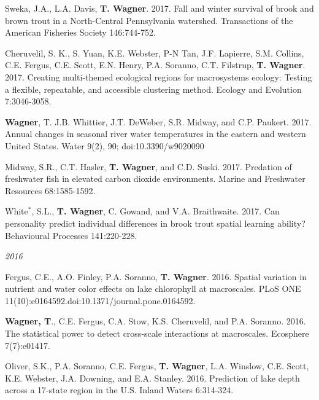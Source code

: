 \documentclass[10pt]{article}
\begin{document}
\begin{flushleft}
\begin{etaremune}[start=68]
\item Sweka, J.A., L.A. Davis, {\bf T. Wagner}. 2017. Fall and winter survival of brook and brown trout in a North-Central Pennsylvania watershed. Transactions of the American Fisheries Society 146:744-752.

\item Cheruvelil, S. K., S. Yuan, K.E. Webster, P-N Tan, J.F. Lapierre, S.M. Collins, C.E. Fergus, C.E. Scott, E.N. Henry, P.A. Soranno, C.T. Filstrup, {\bf T. Wagner}. 2017. Creating multi-themed ecological regions for macrosystems ecology: Testing a flexible, repeatable, and accessible clustering method. Ecology and Evolution 7:3046-3058.

\item {\bf Wagner}, T. J.B. Whittier, J.T. DeWeber, S.R. Midway, and C.P. Paukert. 2017. Annual changes in seasonal river water temperatures in the eastern and western United States. Water 9(2), 90; doi:10.3390/w9020090

\item Midway, S.R., C.T. Hasler, {\bf T. Wagner}, and C.D. Suski. 2017. Predation of freshwater fish in elevated carbon dioxide environments. Marine and Freshwater Resources 68:1585-1592.

\item White$^*$, S.L., {\bf T. Wagner}, C. Gowand, and V.A. Braithwaite. 2017. Can personality predict individual differences in brook trout spatial learning ability? Behavioural Processes 141:220-228. 

\end{etaremune}
\emph{2016}
\begin{etaremune}[start=55]

\item Fergus, C.E., A.O. Finley, P.A. Soranno, {\bf T. Wagner}. 2016. Spatial variation in nutrient and water color effects on lake chlorophyll at macroscales. PLoS ONE 11(10):e0164592.doi:10.1371/journal.pone.0164592.

\item {\bf Wagner, T}., C.E. Fergus, C.A. Stow, K.S. Cheruvelil, and P.A. Soranno. 2016. The statistical power to detect cross-scale interactions at macroscales. Ecosphere 7(7):e01417.

\item Oliver, S.K., P.A. Soranno, C.E. Fergus, {\bf T. Wagner}, L.A. Winslow, C.E. Scott, K.E. Webster, J.A. Downing, and E.A. Stanley. 2016. Prediction of lake depth across a 17-state region in the U.S. Inland Waters 6:314-324.


\end{etaremune}
\end{flushleft}
\end{document}
